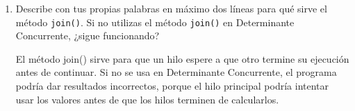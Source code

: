 \documentclass[12pt]{article}
\begin{document}
\begin{enumerate}
    \item Describe con tus propias palabras en máximo dos líneas para qué sirve el método \texttt{join()}. Si no utilizas el método \texttt{join()} en Determinante Concurrente, ¿sigue funcionando?

    El método join() sirve para que un hilo espere a que otro termine su ejecución antes de continuar.
    Si no se usa en Determinante Concurrente, el programa podría dar resultados incorrectos, porque el hilo principal podría intentar usar los valores antes de que los hilos terminen de calcularlos.
    
\end{enumerate}
\end{document}
